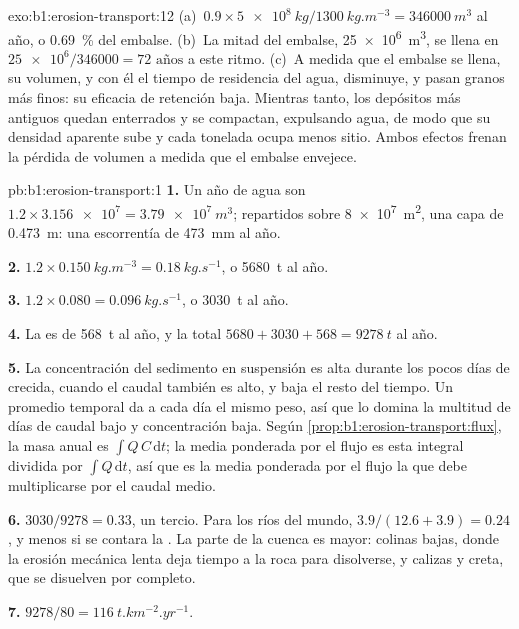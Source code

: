 \begin{solution}{exo:b1:erosion-transport:12}
(a)~$0.9 \times \qty{5e8}{kg}/\qty{1300}{kg.m^{-3}} = \qty{346000}{m^3}$ al año,
o \qty{0.69}{\percent} del embalse. (b)~La mitad del embalse,
\qty{25e6}{m^3}, se llena en $\num{25e6}/\num{346000} = \num{72}\text{ años}$ a este ritmo. (c)~A medida que el embalse se llena, su volumen, y con él el tiempo
de residencia del agua, disminuye, y pasan granos más finos: su eficacia de retención baja.
Mientras tanto, los depósitos más antiguos quedan enterrados y se compactan, expulsando agua, de modo que su densidad aparente sube y cada tonelada ocupa menos sitio.
Ambos efectos frenan la pérdida de volumen a medida que el embalse envejece.
\end{solution}

\begin{solution}{pb:b1:erosion-transport:1}
\textbf{1.} Un año de agua son $1.2 \times \num{3.156e7} = \qty{3.79e7}{m^3}$;
repartidos sobre \qty{8e7}{m^2}, una capa de \qty{0.473}{m}: una escorrentía de
\qty{473}{mm} al año.

\textbf{2.} $1.2 \times \qty{0.150}{kg.m^{-3}} = \qty{0.18}{kg.s^{-1}}$, o
\qty{5680}{t} al año.

\textbf{3.} $1.2 \times 0.080 = \qty{0.096}{kg.s^{-1}}$, o \qty{3030}{t} al
año.

\textbf{4.} La  es de \qty{568}{t} al año, y la total $5680 + 3030 +
568 = \qty{9278}{t}$ al año.

\textbf{5.} La concentración del sedimento en suspensión es alta durante los pocos días
de crecida, cuando el caudal también es alto, y baja el resto del tiempo. Un promedio temporal da a cada día el mismo peso, así que lo domina
la multitud de días de caudal bajo y concentración baja. Según
\cref{prop:b1:erosion-transport:flux}, la masa anual es $\int Q\,C\,\mathrm dt$; la media ponderada por el flujo es esta integral dividida por
$\int Q\,\mathrm dt$, así que es la media ponderada por el flujo la que debe multiplicarse por el caudal medio.

\textbf{6.} $3030/9278 = \num{0.33}$, un tercio. Para los ríos del mundo,
$3.9/(12.6 + 3.9) = \num{0.24}$, y menos si se contara la .
La parte de la cuenca es mayor: colinas bajas, donde la erosión mecánica lenta deja tiempo a la roca para disolverse, y calizas y creta, que se disuelven
por completo.

\textbf{7.} $9278/80 = \qty{116}{t.km^{-2}.yr^{-1}}$.


\end{solution}
